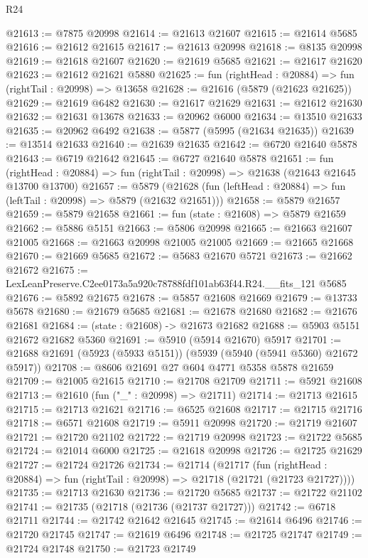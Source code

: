 \begin{lexlean}{R24}
\begin{coremodule}
@21613 := @7875 @20998
@21614 := @21613 @21607
@21615 := @21614 @5685
@21616 := @21612 @21615
@21617 := @21613 @20998
@21618 := @8135 @20998
@21619 := @21618 @21607
@21620 := @21619 @5685
@21621 := @21617 @21620
@21623 := @21612 @21621 @5880
@21625 := fun (rightHead : @20884) => fun (rightTail : @20998) => @13658
@21628 := @21616 (@5879 (@21623 @21625))
@21629 := @21619 @6482
@21630 := @21617 @21629
@21631 := @21612 @21630
@21632 := @21631 @13678
@21633 := @20962 @6000
@21634 := @13510 @21633
@21635 := @20962 @6492
@21638 := @5877 (@5995 (@21634 @21635))
@21639 := @13514 @21633
@21640 := @21639 @21635
@21642 := @6720 @21640 @5878
@21643 := @6719 @21642
@21645 := @6727 @21640 @5878
@21651 := fun (rightHead : @20884) =>
  fun (rightTail : @20998) => @21638 (@21643 @21645 @13700 @13700)
@21657 := @5879
    (@21628 (fun (leftHead : @20884) => fun (leftTail : @20998) => @5879 (@21632 @21651)))
@21658 := @5879 @21657
@21659 := @5879 @21658
@21661 := fun (state : @21608) => @5879 @21659
@21662 := @5886 @5151
@21663 := @5806 @20998
@21665 := @21663 @21607 @21005
@21668 := @21663 @20998 @21005 @21005
@21669 := @21665 @21668
@21670 := @21669 @5685
@21672 := @5683 @21670 @5721
@21673 := @21662 @21672
@21675 := LexLeanPreserve.C2ee0173a5a920c78788fdf101ab63f44.R24.__fits_121 @5685
@21676 := @5892 @21675
@21678 := @5857 @21608 @21669
@21679 := @13733 @5678
@21680 := @21679 @5685
@21681 := @21678 @21680
@21682 := @21676 @21681
@21684 := (state : @21608) -> @21673 @21682
@21688 := @5903 @5151 @21672 @21682 @5360
@21691 := @5910 (@5914 @21670) @5917
@21701 := @21688 @21691 (@5923 (@5933 @5151)) (@5939 (@5940 (@5941 @5360) @21672 @5917))
@21708 := @8606 @21691 @27 @604 @4771 @5358 @5878 @21659
@21709 := @21005 @21615
@21710 := @21708 @21709
@21711 := @5921 @21608
@21713 := @21610 (fun ("_" : @20998) => @21711)
@21714 := @21713 @21615
@21715 := @21713 @21621
@21716 := @6525 @21608
@21717 := @21715 @21716
@21718 := @6571 @21608
@21719 := @5911 @20998
@21720 := @21719 @21607
@21721 := @21720 @21102
@21722 := @21719 @20998
@21723 := @21722 @5685
@21724 := @21014 @6000
@21725 := @21618 @20998
@21726 := @21725 @21629
@21727 := @21724 @21726
@21734 := @21714
    (@21717
      (fun (rightHead : @20884) => fun (rightTail : @20998) => @21718 (@21721 (@21723 @21727))))
@21735 := @21713 @21630
@21736 := @21720 @5685
@21737 := @21722 @21102
@21741 := @21735 (@21718 (@21736 (@21737 @21727)))
@21742 := @6718 @21711
@21744 := @21742 @21642 @21645
@21745 := @21614 @6496
@21746 := @21720 @21745
@21747 := @21619 @6496
@21748 := @21725 @21747
@21749 := @21724 @21748
@21750 := @21723 @21749

\end{coremodule}
\end{lexlean}
